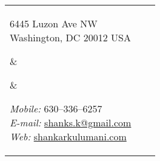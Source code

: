 \newlength{\rcollength}\setlength{\rcollength}{1.8in}%
\newlength{\spacewidth}\setlength{\spacewidth}{20pt}
{}
\begin{tabular}[t]{@{}p{\textwidth-\rcollength-\spacewidth}@{}p{\spacewidth}@{}p{\rcollength}}%

\parbox{\textwidth-\rcollength-\spacewidth}{%
6445 Luzon Ave NW\\
Washington, DC 20012 USA}
&
\parbox[m][2\baselineskip]{\spacewidth}{} &

\parbox{\rcollength}{%
\textit{Mobile:} 630--336--6257 \\
\textit{E-mail:} \href{mailto:shanks.k@gmail.com}{shanks.k@gmail.com} \\
\textit{Web: } \href{https://shankarkulumani.com}{shankarkulumani.com}}

\end{tabular}
